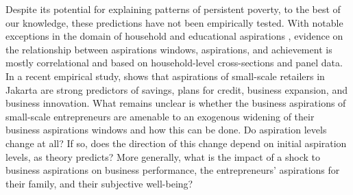 \documentclass[11.5pt]{article}
\begin{document}


Despite its potential for explaining patterns of persistent poverty, to the best of our knowledge, these predictions have not been empirically tested. With notable exceptions in the domain of household and educational aspirations \citep[see,][]{Bernard2014, Riley2017, Macours2014, Beaman2012}, evidence on the relationship between aspirations windows, aspirations, and achievement is mostly correlational and based on household-level cross-sections and panel data. In a recent empirical study, \citep{Dalton2018} shows that aspirations of small-scale retailers in Jakarta are strong predictors of savings, plans for credit, business expansion, and business innovation. What remains unclear is whether the business aspirations of small-scale entrepreneurs are amenable to an exogenous widening of their business aspirations windows and how this can be done. Do aspiration levels change at all? If so, does the direction of this change depend on initial aspiration levels, as theory predicts? More generally, what is the impact of a shock to business aspirations on business performance, the entrepreneurs' aspirations for their family, and their subjective well-being? %

\end{document}
